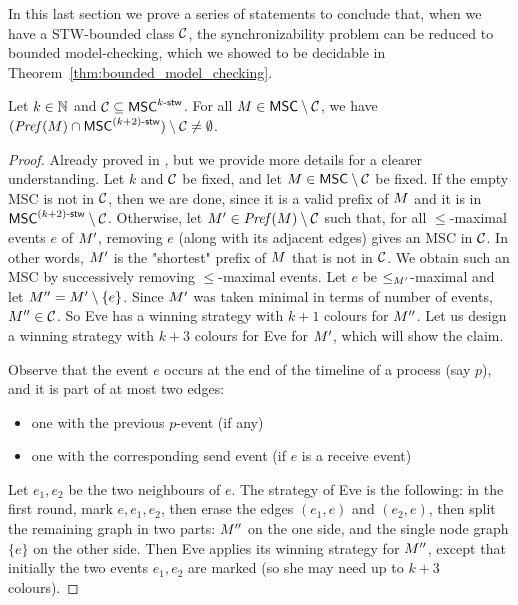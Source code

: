 In this last section we prove a series of statements to conclude that, when we have a STW-bounded class $\mathcal{C}$, the synchronizability problem can be reduced to bounded model-checking, which we showed to be decidable in Theorem~\ref{thm:bounded_model_checking}.

\begin{proposition}\label{prop:pref_stw_k+2}
	Let $k \in \mathbb{N}$ and $\mathcal{C} \subseteq \mathsf{MSC}^{k\textup{-}\mathsf{stw}}$. For all
	$M \in \mathsf{MSC} \setminus \mathcal{C}$, we have
	$(\mathit{Pref}(M) \cap \mathsf{MSC}^{(k+2)\textup{-}\mathsf{stw}}) \setminus \mathcal{C} \neq \emptyset$.
\end{proposition}
\begin{proof}
    Already proved in \cite{DBLP:conf/concur/BolligGFLLS21}, but we provide more details for a clearer understanding.
    Let $k$ and $\mathcal{C}$ be fixed, and let
    $M\in \mathsf{MSC}\setminus \mathcal{C}$ be fixed. If the empty MSC is not in $\mathcal{C}$, then we are done, since it is a valid prefix of $M$ and it is in $\mathsf{MSC}^{(k+2)\textup{-}\mathsf{stw}} \setminus \mathcal{C}$.
    Otherwise, let $M'\in \mathit{Pref}(M) \setminus \mathcal{C}$ such that, for all $\le$-maximal events $e$ of $M'$, removing $e$ (along with its adjacent edges) gives an MSC in $\mathcal{C}$. In other words, $M'$ is the "shortest" prefix of $M$ that is not in $\mathcal{C}$. We obtain such an MSC by successively removing $\le$-maximal events. Let $e$ be $\le_{M'}$-maximal and let $M''=M' \setminus \{e\}$. Since $M'$ was taken minimal in terms of number of events,	$M''\in \mathcal{C}$.
    So Eve has a winning strategy with $k+1$ colours for $M''$.
    Let us design a winning strategy with $k+3$ colours for Eve for $M'$, which will show the claim.

    Observe that the event $e$ occurs at the end of the timeline of a process (say $p$), and it is part of at most two edges:
    \begin{itemize}
        \item one with the previous $p$-event (if any)
        \item one with the corresponding send event (if $e$ is a receive event)
    \end{itemize}
    Let $e_1,e_2$ be the two neighbours of $e$.
    The strategy of Eve is the following: in the first round, mark $e,e_1,e_2$,
    then erase the edges $(e_1,e)$ and $(e_2,e)$, then split the remaining graph
    in two parts: $M''$ on the one side, and the single node graph $\{e\}$ on
    the other side. Then Eve applies its winning strategy for $M''$, except
    that initially the two events $e_1,e_2$ are marked (so she may need up to $k+3$
    colours).
\end{proof}

